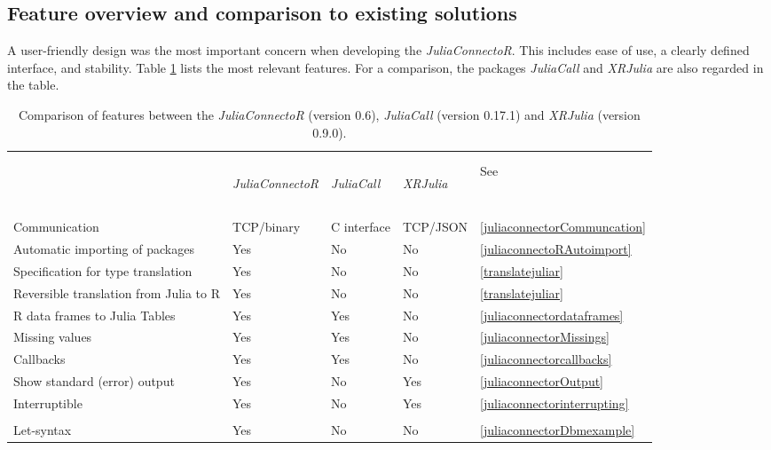 \documentclass[12pt]{article}
\newcommand{\apkg}[1]{\emph{#1}}
\newcommand{\proglang}[1]{#1} %
\begin{document}
\subsection{Feature overview and comparison to existing solutions}
A user-friendly design was the most important concern when developing the \apkg{JuliaConnectoR}.
This includes ease of use, a clearly defined interface, and stability.
Table \ref{tab:JuliaConnectoRFeatures} lists the most relevant features.
For a comparison, the packages \apkg{JuliaCall} and \apkg{XRJulia} are also regarded in the table.

\begin{table}[h!]
\centering
\caption{\label{tab:JuliaConnectoRFeatures} Comparison of features between the
\apkg{JuliaConnectoR} (version 0.6), \apkg{JuliaCall} (version 0.17.1) and
\apkg{XRJulia} (version 0.9.0).}
\begin{tabular}{p{6.75cm} p{1.9cm} p{2.05cm} p{2cm} p{1.2cm}}
\hline \\ [2ex]\\
 & \begin{rotate}{25}\apkg{JuliaConnectoR} \end{rotate} &
 \begin{rotate}{25} \apkg{JuliaCall} \end{rotate} &
 \begin{rotate}{25} \apkg{XRJulia} \end{rotate} &
 See \\
\hline 
\\\\[-4\medskipamount]
Communication & TCP/binary & \proglang{C} interface & TCP/JSON &
\ref{juliaconnectorCommuncation} \\
Automatic importing of packages & Yes & No & No &
\ref{juliaconnectoRAutoimport} \\
Specification for type translation & Yes & No & No &
\ref{translatejuliar} \\
Reversible translation from Julia to R & Yes
& No & No & \ref{translatejuliar} \\
\proglang{R} data frames to \proglang{Julia} Tables & Yes & Yes & No &
\ref{juliaconnectordataframes} \\
Missing values & Yes & Yes & No & \ref{juliaconnectorMissings} \\
Callbacks & Yes & Yes & No & \ref{juliaconnectorcallbacks} \\
Show standard (error) output & Yes & No & Yes &
\ref{juliaconnectorOutput} \\
Interruptible & Yes & No & Yes & \ref{juliaconnectorinterrupting} \\
\\[-2\medskipamount]
Let-syntax & Yes & No & No & \ref{juliaconnectorDbmexample} \\
\hline
\end{tabular}
\end{table}
\end{document}
